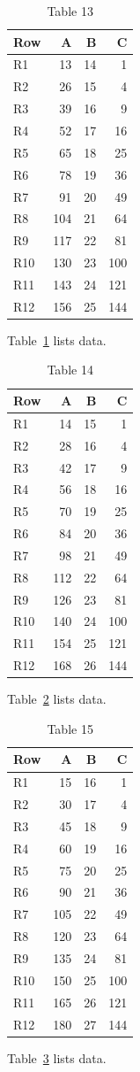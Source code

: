 \documentclass[10pt]{article}
\begin{document}
\begin{table}[ht]\centering\caption{Table 13}\label{tab:13}\begin{tabular}{lrrr}\toprule Row&A&B&C\\\midrule
R1&13&14&1\\
R2&26&15&4\\
R3&39&16&9\\
R4&52&17&16\\
R5&65&18&25\\
R6&78&19&36\\
R7&91&20&49\\
R8&104&21&64\\
R9&117&22&81\\
R10&130&23&100\\
R11&143&24&121\\
R12&156&25&144\\
\bottomrule\end{tabular}\end{table} Table~\ref{tab:13} lists data.
\begin{table}[ht]\centering\caption{Table 14}\label{tab:14}\begin{tabular}{lrrr}\toprule Row&A&B&C\\\midrule
R1&14&15&1\\
R2&28&16&4\\
R3&42&17&9\\
R4&56&18&16\\
R5&70&19&25\\
R6&84&20&36\\
R7&98&21&49\\
R8&112&22&64\\
R9&126&23&81\\
R10&140&24&100\\
R11&154&25&121\\
R12&168&26&144\\
\bottomrule\end{tabular}\end{table} Table~\ref{tab:14} lists data.
\begin{table}[ht]\centering\caption{Table 15}\label{tab:15}\begin{tabular}{lrrr}\toprule Row&A&B&C\\\midrule
R1&15&16&1\\
R2&30&17&4\\
R3&45&18&9\\
R4&60&19&16\\
R5&75&20&25\\
R6&90&21&36\\
R7&105&22&49\\
R8&120&23&64\\
R9&135&24&81\\
R10&150&25&100\\
R11&165&26&121\\
R12&180&27&144\\
\bottomrule\end{tabular}\end{table} Table~\ref{tab:15} lists data.
\end{document}
